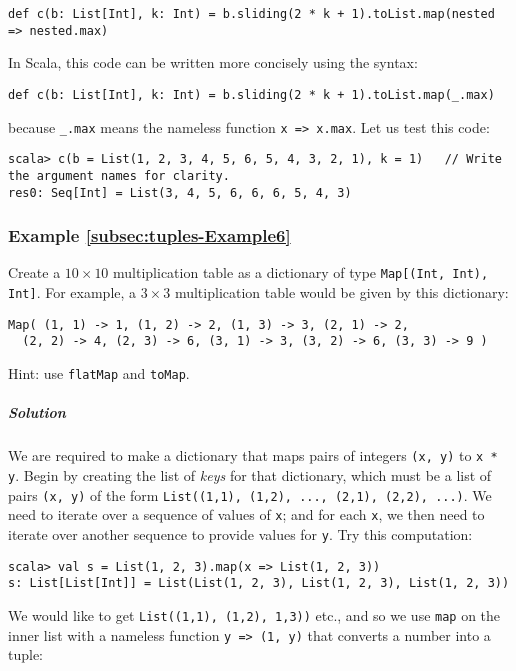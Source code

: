 \begin{lstlisting}
def c(b: List[Int], k: Int) = b.sliding(2 * k + 1).toList.map(nested => nested.max)
\end{lstlisting}
In Scala, this code can be written more concisely using the syntax:
\begin{lstlisting}
def c(b: List[Int], k: Int) = b.sliding(2 * k + 1).toList.map(_.max)
\end{lstlisting}
because \lstinline!_.max! means the nameless function \lstinline!x => x.max!.
Let us test this code:
\begin{lstlisting}
scala> c(b = List(1, 2, 3, 4, 5, 6, 5, 4, 3, 2, 1), k = 1)   // Write the argument names for clarity.
res0: Seq[Int] = List(3, 4, 5, 6, 6, 6, 5, 4, 3)
\end{lstlisting}


\subsubsection{Example \label{subsec:tuples-Example6}\ref{subsec:tuples-Example6}}

Create a $10\times10$ multiplication table as a dictionary of type
\lstinline!Map[(Int, Int), Int]!. For example, a $3\times3$ multiplication
table would be given by this dictionary:
\begin{lstlisting}
Map( (1, 1) -> 1, (1, 2) -> 2, (1, 3) -> 3, (2, 1) -> 2,
  (2, 2) -> 4, (2, 3) -> 6, (3, 1) -> 3, (3, 2) -> 6, (3, 3) -> 9 )
\end{lstlisting}

Hint: use \lstinline!flatMap! and \lstinline!toMap!.

\subparagraph{Solution}

We are required to make a dictionary that maps pairs of integers \lstinline!(x, y)!
to \lstinline!x * y!. Begin by creating the list of \emph{keys} for
that dictionary, which must be a list of pairs \lstinline!(x, y)!
of the form \lstinline!List((1,1), (1,2), ..., (2,1), (2,2), ...)!.
We need to iterate over a sequence of values of \lstinline!x!; and
for each \lstinline!x!, we then need to iterate over another sequence
to provide values for \lstinline!y!. Try this computation:
\begin{lstlisting}
scala> val s = List(1, 2, 3).map(x => List(1, 2, 3))
s: List[List[Int]] = List(List(1, 2, 3), List(1, 2, 3), List(1, 2, 3))
\end{lstlisting}
We would like to get \lstinline!List((1,1), (1,2), 1,3))! etc., and
so we use \lstinline!map! on the inner list with a nameless function
\lstinline!y => (1, y)! that converts a number into a tuple:

